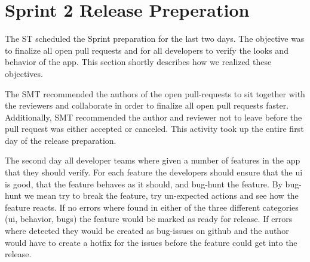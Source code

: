 \section{Sprint 2 Release Preperation}
The \gls{ST} scheduled the Sprint preparation for the last two days. The objective was to finalize all open pull requests and for all developers to verify the looks and behavior of the app. This section shortly describes how we realized these objectives.

The \gls{SMT} recommended the authors of the open pull-requests to sit together with the reviewers and collaborate in order to finalize all open pull requests faster. Additionally, \gls{SMT} recommended the author and reviewer not to leave before the pull request was either accepted or canceled. This activity took up the entire first day of the release preparation.

The second day all developer teams where given a number of features in the app that they should verify. For each feature the developers should ensure that the \gls{ui} is good, that the feature behaves as it should, and bug-hunt the feature. By bug-hunt we mean try to break the feature, try un-expected actions and see how the feature reacts. If no errors where found in either of the three different categories (\gls{ui}, behavior, bugs) the feature would be marked as ready for release. If errors where detected they would be created as bug-issues on github and the author would have to create a hotfix for the issues before the feature could get into the release.

